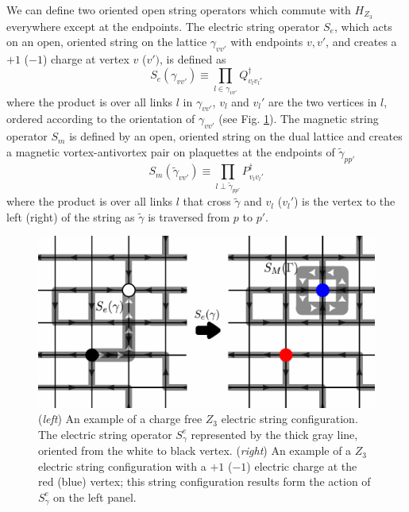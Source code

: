 \documentclass[twocolumn,prb,aps,floatfix,superscriptaddress]{revtex4-1}
\newcommand{\figref}[1]{Fig. \ref{#1}}
\begin{document}
We can define two oriented open string operators which commute with $H_{Z_3}$ everywhere except at the endpoints. The electric string operator $S_e$, which acts on an open, oriented string on the lattice $\gamma_{vv'}$ with endpoints $v,v'$, and creates a $+1$ ($-1$) charge at vertex $v$ ($v')$, is defined as
\begin{equation}
    S_e \left( \gamma_{vv'} \right) \equiv \prod_{l \in \gamma_{vv'}} Q_{v_l v_l'}^\dagger
\end{equation}
where the product is over all links $l$ in $\gamma_{vv'}$, $v_l$ and $v_l'$ are the two vertices in $l$, ordered according to the orientation of $\gamma_{vv'}$ (see \figref{fig:example_elec_string}). The magnetic string operator $S_m$ is defined by an open, oriented string on the dual lattice and creates a magnetic vortex-antivortex pair on plaquettes at the endpoints of $\tilde{\gamma}_{pp'}$
\begin{equation}
    S_m \left( \tilde{\gamma}_{vv'} \right) \equiv \prod_{l \perp \tilde{\gamma}_{pp'}} P_{v_l v_l'}^\dagger
\end{equation}
where the product is over all links $l$ that cross $\tilde{\gamma}$ and $v_l$ ($v_l'$) is the vertex to the left (right) of the string as $\tilde{\gamma}$ is traversed from $p$ to $p'$. 
\begin{figure}[t]
    \centering
    \includegraphics[width=1.0\linewidth]{example_elec_string.pdf}
    \caption{ ({\it left}) An example of a charge free $Z_3$ electric string configuration. The electric string operator $S_\gamma^e$ represented by the thick gray line, oriented from the white to black vertex. ({\it right}) An example of a $Z_3$ electric string configuration with a $+1$ ($-1$) electric charge at the red (blue) vertex; this string configuration results form the action of $S_\gamma^e$ on the left panel.  }
    \label{fig:example_elec_string}
\end{figure}
\end{document}
